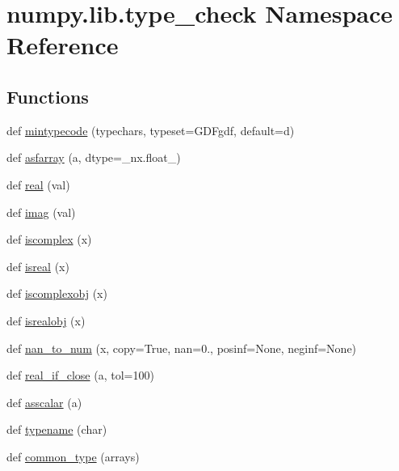 \hypertarget{namespacenumpy_1_1lib_1_1type__check}{}\section{numpy.\+lib.\+type\+\_\+check Namespace Reference}
\label{namespacenumpy_1_1lib_1_1type__check}
\subsection*{Functions}
\begin{DoxyCompactItemize}
\item 
def \hyperlink{namespacenumpy_1_1lib_1_1type__check_ac66550f4eed168c89e7b137be8aa0e24}{mintypecode} (typechars, typeset=\textquotesingle{}G\+D\+Fgdf\textquotesingle{}, default=\textquotesingle{}d\textquotesingle{})
\item 
def \hyperlink{namespacenumpy_1_1lib_1_1type__check_a853f135e392aa75e4324178f5760e297}{asfarray} (a, dtype=\+\_\+nx.\+float\+\_\+)
\item 
def \hyperlink{namespacenumpy_1_1lib_1_1type__check_ada19847ca30633d25ba2d178fcaf5a9c}{real} (val)
\item 
def \hyperlink{namespacenumpy_1_1lib_1_1type__check_a5c7944d6dcfdeeffd527e27aa947fcd5}{imag} (val)
\item 
def \hyperlink{namespacenumpy_1_1lib_1_1type__check_a01ec19c6332adc2ec94f0faac9fa0df8}{iscomplex} (x)
\item 
def \hyperlink{namespacenumpy_1_1lib_1_1type__check_aa38162fdf9ab6e0b32468d91f9adb913}{isreal} (x)
\item 
def \hyperlink{namespacenumpy_1_1lib_1_1type__check_ab1056475395022325c9780521c226336}{iscomplexobj} (x)
\item 
def \hyperlink{namespacenumpy_1_1lib_1_1type__check_a243f51ea0c073459dfef76f57affe775}{isrealobj} (x)
\item 
def \hyperlink{namespacenumpy_1_1lib_1_1type__check_a05b555a98673209991832e412ec065e1}{nan\+\_\+to\+\_\+num} (x, copy=True, nan=0., posinf=None, neginf=None)
\item 
def \hyperlink{namespacenumpy_1_1lib_1_1type__check_a683f9ae38ede923459af21704a204578}{real\+\_\+if\+\_\+close} (a, tol=100)
\item 
def \hyperlink{namespacenumpy_1_1lib_1_1type__check_a71ca4737b4990b88a935aa95d56223ef}{asscalar} (a)
\item 
def \hyperlink{namespacenumpy_1_1lib_1_1type__check_a27c3eb8ea21dc56f429d37473745d444}{typename} (char)
\item 
def \hyperlink{namespacenumpy_1_1lib_1_1type__check_ad11c5d561fadf051427821a0f1749879}{common\+\_\+type} (arrays)
\end{DoxyCompactItemize}
